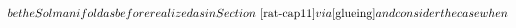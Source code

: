 $$ be the Sol manifold as before realized as in Section~\ref{rat-cap11} via \eqref{glueing} and consider the case when $$